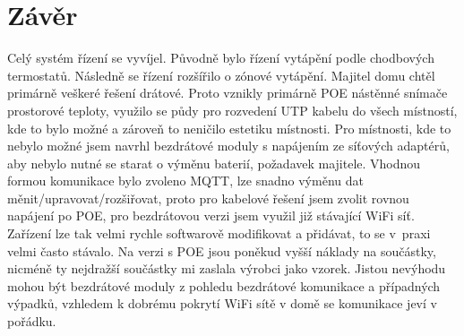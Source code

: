 \chapter{Závěr}
Celý systém řízení se vyvíjel. Původně bylo řízení vytápění podle chodbových termostatů. Následně se řízení rozšířilo o zónové vytápění. Majitel domu chtěl primárně veškeré řešení drátové. Proto vznikly primárně POE nástěnné snímače prostorové teploty, využilo se půdy pro rozvedení UTP kabelu do všech místností, kde to bylo možné a zároveň to neničilo estetiku místnosti. Pro místnosti, kde to nebylo možné jsem navrhl bezdrátové moduly s napájením ze síťových adaptérů, aby nebylo nutné se starat o výměnu baterií, požadavek majitele. Vhodnou formou komunikace bylo zvoleno MQTT, lze snadno výměnu dat měnit/upravovat/rozšiřovat, proto pro kabelové řešení jsem zvolit rovnou napájení po POE, pro bezdrátovou verzi jsem využil již stávající WiFi síť. Zařízení lze tak velmi rychle softwarově modifikovat a přidávat, to se v~praxi velmi často stávalo. Na verzi s POE jsou poněkud vyšší náklady na součástky, nicméně ty nejdražší součástky mi zaslala výrobci jako vzorek. Jistou nevýhodu mohou být bezdrátové moduly z pohledu bezdrátové komunikace a případných výpadků, vzhledem k dobrému pokrytí WiFi sítě v domě se komunikace jeví v pořádku.




